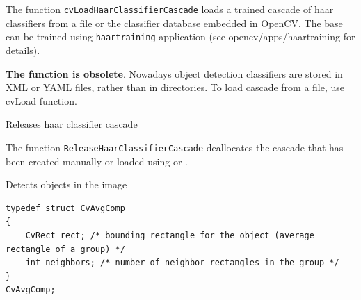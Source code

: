 The function \texttt{cvLoadHaarClassifierCascade} loads a trained cascade
of haar classifiers from a file or the classifier database embedded in
OpenCV. The base can be trained using \texttt{haartraining} application
(see opencv/apps/haartraining for details).

\textbf{The function is obsolete}. Nowadays object detection classifiers are stored in XML or YAML files, rather than in directories. To load cascade from a file, use cvLoad function.

\label{ReleaseHaarClassifierCascade}

Releases haar classifier cascade


\begin{description}
\end{description}

The function \texttt{ReleaseHaarClassifierCascade} deallocates the cascade that has been created manually or loaded using  or .

\label{HaarDetectObjects}

Detects objects in the image

\begin{lstlisting}
typedef struct CvAvgComp
{
    CvRect rect; /* bounding rectangle for the object (average rectangle of a group) */
    int neighbors; /* number of neighbor rectangles in the group */
}
CvAvgComp;
\end{lstlisting}


